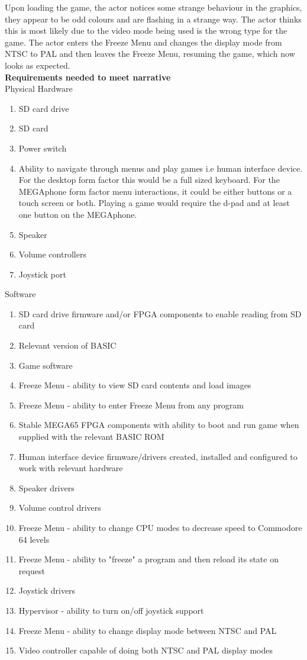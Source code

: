 Upon loading the game, the actor notices some strange behaviour in the graphics, they appear to be odd colours and are flashing in a strange way. The actor thinks this is most likely due to the video mode being used is the wrong type for the game. The actor enters the Freeze Menu and changes the display mode from NTSC to PAL and then leaves the Freeze Menu, resuming the game, which now looks as expected.\\

\textbf{Requirements needed to meet narrative}\\
Physical Hardware
\begin{enumerate}
\item SD card drive
\item SD card
\item Power switch
\item Ability to navigate through menus and play games i.e human interface device. For the desktop form factor this would be a full sized keyboard. For the MEGAphone form factor menu interactions, it could be either buttons or a touch screen or both. Playing a game would require the d-pad and at least one button on the MEGAphone.
\item Speaker
\item Volume controllers
\item Joystick port
\end{enumerate}

Software\\
\begin{enumerate}
\item SD card drive firmware and/or FPGA components to enable reading from SD card
\item Relevant version of BASIC 
\item Game software
\item Freeze Menu - ability to view SD card contents and load images
\item Freeze Menu - ability to enter Freeze Menu from any program
\item Stable MEGA65 FPGA components with ability to boot and run game when supplied with the relevant BASIC ROM
\item Human interface device firmware/drivers created, installed and configured to work with relevant hardware
\item Speaker drivers
\item Volume control drivers 
\item Freeze Menu - ability to change CPU modes to decrease speed to Commodore 64 levels
\item Freeze Menu - ability to "freeze" a program and then reload its state on request
\item Joystick drivers
\item Hypervisor - ability to turn on/off joystick support
\item Freeze Menu - ability to change display mode between NTSC and PAL
\item Video controller capable of doing both NTSC and PAL display modes
\end{enumerate}

